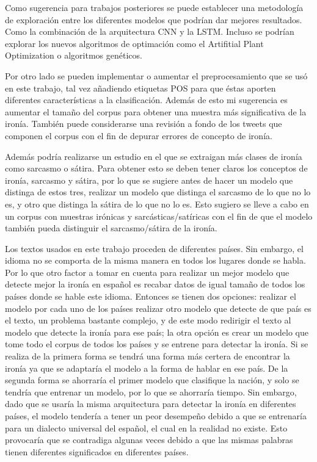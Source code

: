 \par Como sugerencia para trabajos posteriores se puede establecer una metodología de exploración entre los diferentes modelos que podrían dar mejores resultados. Como la combinación de la arquitectura CNN y la LSTM. Incluso se podrían explorar los nuevos algoritmos de optimación como el Artifitial Plant Optimization o algoritmos genéticos.

\par Por otro lado se pueden implementar o aumentar el preprocesamiento que se usó en este trabajo, tal vez añadiendo etiquetas POS para que éstas aporten diferentes características a la clasificación. Además de esto mi sugerencia es aumentar el tamaño del corpus para obtener una muestra más significativa de la ironía. También puede considerarse una revisión a fondo de los tweets que componen el corpus con el fin de depurar errores de concepto de ironía.

\par Además podría realizarse un estudio en el que se extraigan más clases de ironía como sarcasmo o sátira. Para obtener esto se deben tener claros los conceptos de ironía, sarcasmo y sátira, por lo que se sugiere antes de hacer un modelo que distinga de estos tres, realizar un modelo que distinga el sarcasmo de lo que no lo es, y otro que distinga la sátira de lo que no lo es. Esto sugiero se lleve a cabo en un corpus con muestras irónicas y sarcásticas/satíricas con el fin de que el modelo también pueda distinguir el sarcasmo/sátira de la ironía.

\par Los textos usados en este trabajo proceden de diferentes países. Sin embargo, el idioma no se comporta de la misma manera en todos los lugares donde se habla. Por lo que otro factor a tomar en cuenta para realizar un mejor modelo que detecte mejor la ironía en español es recabar datos de igual tamaño de todos los países donde se hable este idioma. Entonces se tienen dos opciones: realizar el modelo por cada uno de los países realizar otro modelo que detecte de que país es el texto, un problema bastante complejo, y de este modo redirigir el texto al modelo que detecte la ironía para ese país; la otra opción es crear un modelo que tome todo el corpus de todos los países y se entrene para detectar la ironía. Si se realiza de la primera forma se tendrá una forma más certera de encontrar la ironía ya que se adaptaría el modelo a la forma de hablar en ese país. De la segunda forma se ahorraría el primer modelo que clasifique la nación, y solo se tendría que entrenar un modelo, por lo que se ahorraría tiempo. Sin embargo, dado que se usaría la misma arquitectura para detectar la ironía en diferentes países, el modelo tendería a tener un peor desempeño debido a que se entrenaría para un dialecto universal del español, el cual en la realidad no existe. Esto provocaría que se contradiga algunas veces debido a que las mismas palabras tienen diferentes significados en diferentes países.